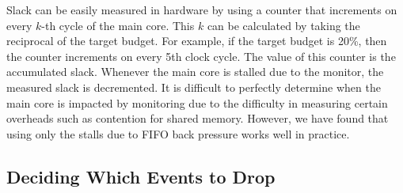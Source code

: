 
Slack can be easily measured in hardware by using a counter that increments on every $k$-th
cycle of the main core. This $k$ can be calculated by taking the reciprocal of
the target budget. For example, if the target budget is 20\%, then the counter
increments on every 5th clock cycle. The value of this counter is the
accumulated slack. Whenever the main core is stalled due to the monitor, the measured slack
is decremented. It is difficult to perfectly determine when the main core is impacted by monitoring due to the
difficulty in measuring certain overheads such as contention for shared memory.
However, we have found that using only the stalls due to FIFO back pressure
works well in practice.

\subsection{Deciding Which Events to Drop} 
\label{sec:policies.which}

